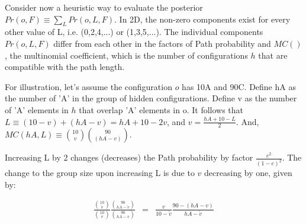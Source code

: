 \documentclass{article}
\begin{document}
Consider now a heuristic way to evaluate the posterior $Pr(o,F) \equiv
\sum_L Pr(o,L,F)$. In 2D, the non-zero components exist for every
other value of L, i.e. (0,2,4,...) or (1,3,5,...). The individual
components $Pr(o,L,F)$ differ from each other in the factors of Path
probability and $MC()$, the multinomial coefficient, which is the number
of configurations $h$ that are compatible with the path
length.

For illustration, let's assume the configuration $o$ has 10A and 90C.
Define hA as the number of 'A' in the group of hidden configurations.
Define v as the number of 'A' elements in $h$ that overlap 'A'
elements in o.  It follows that $L \equiv (10-v) + (hA-v) = hA + 10 -
2v$, and $v = \frac{hA + 10 - L}{2}$.  And, $MC(hA,L) \equiv {10
  \choose v}{90 \choose (hA-v)}$.

Increasing L by 2 changes (decreases) the Path probability by factor
$\frac{e^2}{(1-e)^2}$. The change to the group size upon increasing L
is due to $v$ decreasing by one, given by:

\begin{eqnarray}
  \frac{{10 \choose \check{v}}}{{10 \choose v}}
  \frac{{90 \choose hA-\check{v}}}{{90 \choose hA-v}} \nonumber
& = &
  \frac{v}{10-\check{v}}
  \frac{90-(hA-v)}{hA-\check{v}}
\end{eqnarray}
\end{document}
